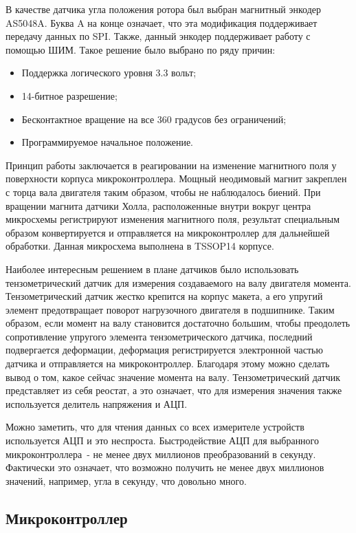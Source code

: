 В качестве датчика угла положения ротора был выбран магнитный энкодер AS5048A. Буква A на
конце означает, что эта модификация поддерживает передачу данных по SPI. Также, данный
энкодер поддерживает работу с помощью ШИМ. Такое решение было выбрано по ряду причин:
\begin{itemize}
  \item Поддержка логического уровня 3.3 вольт;
  \item 14-битное разрешение;
  \item Бесконтактное вращение на все 360 градусов без ограничений;
  \item Программируемое начальное положение.
\end{itemize}
Принцип работы заключается в реагировании на изменение магнитного поля у поверхности 
корпуса микроконтроллера. Мощный неодимовый магнит закреплен с торца вала двигателя
таким образом, чтобы не наблюдалось биений. При вращении магнита датчики Холла, 
расположенные внутри вокруг центра микросхемы регистрируют изменения магнитного поля,
результат специальным образом конвертируется и отправляется на микроконтроллер для
дальнейшей обработки. Данная микросхема выполнена в TSSOP14 корпусе. 

Наиболее интересным решением в плане датчиков было использовать тензометрический датчик
для измерения создаваемого на валу двигателя момента. Тензометрический датчик жестко крепится
на корпус макета, а его упругий элемент предотвращает поворот нагрузочного двигателя в подшипнике.
Таким образом, если момент на валу становится достаточно большим, чтобы преодолеть сопротивление
упругого элемента тензометрического датчика, последний подвергается деформации, деформация 
регистрируется
электронной частью датчика и отправляется на микроконтроллер. Благодаря этому можно сделать вывод
о том, какое сейчас значение момента на валу. Тензометрический датчик представляет из себя
реостат, а это означает, что для измерения значения также используется делитель напряжения и АЦП.

Можно заметить, что для чтения данных со всех измерителе устройств используется АЦП и это неспроста. 
Быстродействие АЦП для выбранного микроконтроллера~- не менее двух миллионов преобразований в секунду.
Фактически это означает, что возможно получить не менее двух миллионов значений, например, 
угла в секунду, что довольно много.

\subsection{Микроконтроллер}

